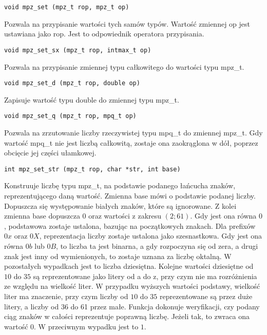 \documentclass[twoside,a4paper]{book}
\begin{document}
\begin{lstlisting}
void mpz_set (mpz_t rop, mpz_t op)
\end{lstlisting}

Pozwala na przypisanie wartości tych samów typów. Wartość zmiennej op jest ustawiana jako rop. Jest to odpowiednik operatora przypisania.

\begin{lstlisting}
void mpz_set_sx (mpz_t rop, intmax_t op)
\end{lstlisting}

Pozwala na przypisanie zmiennej typu całkowitego do wartości typu mpz\_t.

\begin{lstlisting}
void mpz_set_d (mpz_t rop, double op)
\end{lstlisting}

Zapisuje wartość typu double do zmiennej typu mpz\_t.

\begin{lstlisting}
void mpz_set_q (mpz_t rop, mpq_t op)
\end{lstlisting}

Pozwala na zrzutowanie liczby rzeczywistej typu mpq\_t do zmiennej mpz\_t. Gdy wartość mpq\_t nie jest liczbą całkowitą, zostaje ona zaokrąglona w dół, poprzez obcięcie jej części ułamkowej.

\begin{lstlisting}
int mpz_set_str (mpz_t rop, char *str, int base)
\end{lstlisting}

Konstruuje liczbę typu mpz\_t, na podstawie podanego łańcucha znaków, reprezentującego daną wartość. Zmienna base mówi o podstawie podanej liczby. Dopuszcza się występowanie białych znaków, które są ignorowane. Z kolei zmienna base dopuszcza $0$ oraz wartości z zakresu $(2;61)$. Gdy jest ona równa $0$, podstawowa zostaje ustalona, bazując na początkowych znakach. Dla prefixów $0x$ oraz $0X$, reprezentacja liczby zostaje ustalona jako szesnastkowa. Gdy jest ona równa $0b$ lub $0B$, to liczba ta jest binarna, a gdy rozpoczyna się od zera, a drugi znak jest inny od wymienionych, to zostaje uznana za liczbę oktalną. W pozostałych wypadkach jest to liczba dziesiętna. Kolejne wartości dziesiętne od $10$ do $35$ są reprezentowane jako litery od a do z, przy czym nie ma rozróżnienia ze względu na wielkość liter. W przypadku wyższych wartości podstawy, wielkość liter ma znaczenie, przy czym liczby od $10$ do $35$ reprezentowane są przez duże litery, a liczby od 36 do 61 przez małe. Funkcja dokonuje weryfikacji, czy podany ciąg znaków w całości reprezentuje poprawną liczbę. Jeżeli tak, to zwraca ona wartość $0$. W przeciwnym wypadku jest to $1$.
\end{document}
